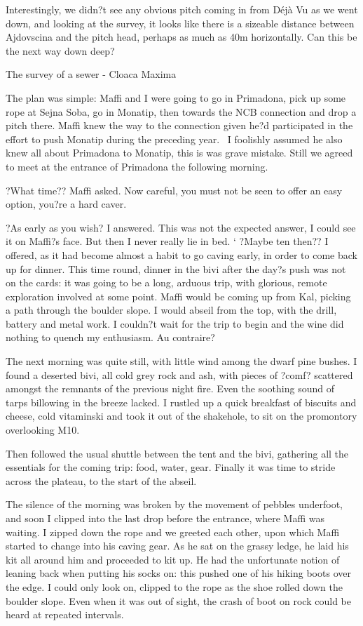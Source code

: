 \documentclass[onecolumn]{book}
\begin{document}
Interestingly, we didn?t see any obvious pitch coming in from Déjà Vu as we went down, and looking at the survey, it looks like there is a sizeable distance between Ajdovscina and the pitch head, perhaps as much as 40m horizontally. Can this be the next way down deep?

The survey of a sewer - Cloaca Maxima

The plan was simple: Maffi and I were going to go in Primadona, pick up some rope at Sejna Soba, go in Monatip, then towards the NCB connection and drop a pitch there. Maffi knew the way to the connection given he?d participated in the effort to push Monatip during the preceding year.  I foolishly assumed he also knew all about Primadona to Monatip, this is was grave mistake. Still we agreed to meet at the entrance of Primadona the following morning. 

?What time?? Maffi asked. Now careful, you must not be seen to offer an easy option, you?re a hard caver.

?As early as you wish? I answered. This was not the expected answer, I could see it on Maffi?s face. But then I never really lie in bed.
`
?Maybe ten then?? I offered, as it had become almost a habit to go caving early, in order to come back up for dinner. This time round, dinner in the bivi after the day?s push was not on the cards: it was going to be a long, arduous trip, with glorious, remote exploration involved at some point. Maffi would be coming up from Kal, picking a path through the boulder slope. I would abseil from the top, with the drill, battery and metal work. I couldn?t wait for the trip to begin and the wine did nothing to quench my enthusiasm. Au contraire?

The next morning was quite still, with little wind among the dwarf pine bushes. I found a deserted bivi, all cold grey rock and ash, with pieces of ?comf? scattered amongst the remnants of the previous night fire. Even the soothing sound of tarps billowing in the breeze lacked. I rustled up a quick breakfast of biscuits and cheese, cold vitaminski and took it out of the shakehole, to sit on the promontory overlooking M10. 

Then followed the usual shuttle between the tent and the bivi, gathering all the essentials for the coming trip: food, water, gear. Finally it was time to stride across the plateau, to the start of the abseil. 

The silence of the morning was broken by the movement of pebbles underfoot, and soon I clipped into the last drop before the entrance, where Maffi was waiting. I zipped down the rope and we greeted each other, upon which Maffi started to change into his caving gear. As he sat on the grassy ledge, he laid his kit all around him and proceeded to kit up. He had the unfortunate notion of leaning back when putting his socks on: this pushed one of his hiking boots over the edge. I could only look on, clipped to the rope as the shoe rolled down the boulder slope. Even when it was out of sight, the crash of boot on rock could be heard at repeated intervals. 
\end{document}

